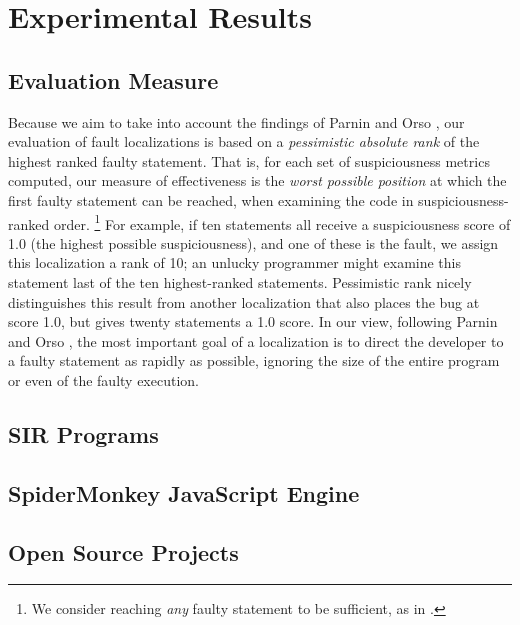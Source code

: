 \section{Experimental Results}
\label{sec:experiments}

\subsection{Evaluation Measure}

Because we aim to take into account the findings of Parnin and Orso
\cite{AutoHelp}, our evaluation of fault localizations is based on a
\emph{pessimistic absolute rank} of the highest ranked faulty
statement.  That is, for each set of suspiciousness metrics computed,
our measure of effectiveness is the \emph{worst possible position} at
which the first faulty statement can be reached, when examining the
code in suspiciousness-ranked order.
\footnote{We consider reaching \emph{any} faulty statement to be sufficient, as in \cite{NearNeighbor}.}
For example,
if ten statements all receive a suspiciousness score of 1.0 (the
highest possible suspiciousness), and one of these is the fault, we
assign this localization a rank of 10; an unlucky programmer might
examine this statement last of the ten highest-ranked statements.
Pessimistic rank nicely distinguishes this result from another
localization that also places the bug at score 1.0, but gives twenty
statements a 1.0 score. In our view, following Parnin and Orso
\cite{AutoHelp}, the most important goal of a localization is to
direct the developer to a faulty statement as rapidly as possible,
ignoring the size of the entire program or even of the faulty
execution.  

\subsection{SIR Programs}


\subsection{SpiderMonkey JavaScript Engine}


\subsection{Open Source Projects}
\label{sec:opensource}



